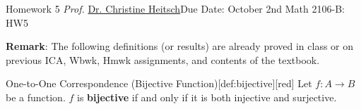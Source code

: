 \newpage{}
{Homework 5}
{\textit{Prof.} \href{https://ceheitsch.github.io/webpage/}{Dr. Christine Heitsch}}{Due Date: October 2nd}
{Math 2106-B: HW5}
\newpage






\textbf{Remark}: The following definitions (or results) are already proved in class or on previous ICA, 
Wbwk, Hmwk assignments, and contents of the textbook.

\begin{define}{One-to-One Correspondence (Bijective Function)}[def:bijective][red]
  Let $f : A \to B$ be a function. $f$ is \textbf{bijective} if and only if it is both injective and surjective.
\end{define}

